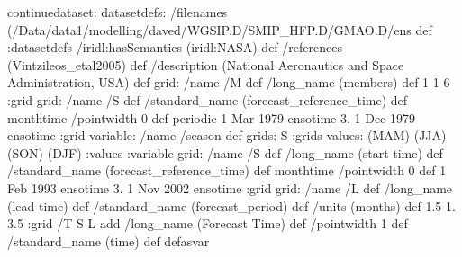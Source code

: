 \begin{ingrid}
continuedataset:
datasetdefs:
/filenames
{ (/Data/data1/modelling/daved/WGSIP.D/SMIP_HFP.D/GMAO.D/ens%
} def
:datasetdefs
/iridl:hasSemantics (iridl:NASA) def
/references (Vintzileos_etal2005) def
/description (National Aeronautics and Space Administration, USA) def
grid:
/name /M def
/long_name (members) def
1 1 6
:grid
grid:
/name /S def
/standard_name (forecast_reference_time) def
monthtime
/pointwidth 0 def
periodic
1 Mar 1979 ensotime
3.
1 Dec 1979 ensotime
:grid
variable:
/name /season def
grids: S :grids
values:
(MAM)
(JJA)
(SON)
(DJF)
:values
:variable
grid:
/name /S def
/long_name (start time) def
/standard_name (forecast_reference_time) def
monthtime
/pointwidth 0 def
1 Feb 1993 ensotime
3.
1 Nov 2002 ensotime
:grid
grid:
/name /L def
/long_name (lead time) def
/standard_name (forecast_period) def
/units (months) def
1.5 1. 3.5
:grid
/T { S L add /long_name (Forecast Time) def /pointwidth 1 def
/standard_name (time) def
} defasvar
\end{ingrid}

